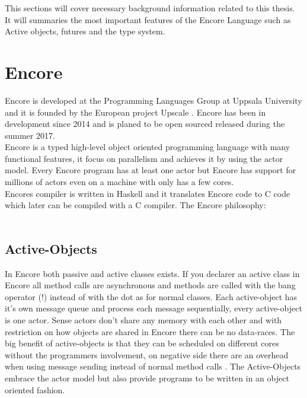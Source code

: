 This sections will cover necessary background information related to this thesis. It will summaries the most important features of the Encore Language such as Active objects, futures and the type system.

\section{Encore}
Encore is developed at the Programming Languages Group \citep{researchgroup} at Uppsala University and it is founded by the European project Upscale \citep{upscale}. Encore has been in development since 2014 and is planed to be open sourced released during the summer 2017. \\

Encore is a typed high-level object oriented programming language with many functional features, it focus on parallelism and achieves it by using the actor model. Every Encore program has at least one actor but Encore has support for millions of actors even on a machine with only has a few cores. \\

Encores compiler is written in Haskell \citep{website:haskell} and it translates Encore code to C code which later can be compiled with a C compiler. The Encore philosophy: \\ \\  \citep{encore}

\subsection{Active-Objects}
In Encore both passive and active classes exists. If you declarer an active class in Encore all method calls are asynchronous and methods are called with the bang operator (!) instead of with the dot as for normal classes. Each active-object has it’s own message queue and process each message sequentially, every active-object is one actor. Sense actors don’t share any memory with each other and with restriction on how objects are shared \citep{kappa} in Encore there can be no data-races. The big benefit of active-objects is that they can be scheduled on different cores without the programmers involvement, on negative side there are an overhead when using message sending instead of normal method calls \citep{encore_paper}. The Active-Objects embrace the actor model but also provide programs to be written in an object oriented fashion.

